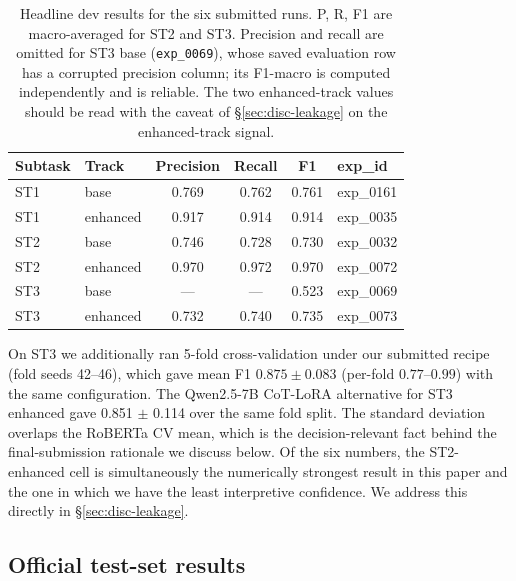 \begin{table}[h]
\centering
\small
\caption{Headline dev results for the six submitted runs. P, R, F1 are macro-averaged
for ST2 and ST3. Precision and recall are omitted for ST3 base
(\texttt{exp\_0069}), whose saved evaluation row has a corrupted precision
column; its F1-macro is computed independently and is reliable. The two
enhanced-track values should be read with the caveat of
\S\ref{sec:disc-leakage} on the enhanced-track signal.}
\label{tab:headline}
\begin{tabular}{llcccl}
\toprule
Subtask & Track & Precision & Recall & F1 & exp\_id \\
\midrule
ST1 & base     & 0.769 & 0.762 & 0.761 & exp\_0161 \\ %
ST1 & enhanced & 0.917 & 0.914 & 0.914 & exp\_0035 \\ %
ST2 & base     & 0.746 & 0.728 & 0.730 & exp\_0032 \\ %
ST2 & enhanced & 0.970 & 0.972 & 0.970 & exp\_0072 \\ %
ST3 & base     & ---   & ---   & 0.523 & exp\_0069 \\ %
ST3 & enhanced & 0.732 & 0.740 & 0.735 & exp\_0073 \\ %
\bottomrule
\end{tabular}
\end{table}

On ST3 we additionally ran 5-fold cross-validation under our submitted recipe (fold seeds 42--46), which gave mean F1 $0.875 \pm 0.083$ (per-fold $0.77$--$0.99$) with the same configuration. %
The Qwen2.5-7B CoT-LoRA alternative for ST3 enhanced gave 0.851 $\pm$ 0.114 over the same fold split. The standard deviation overlaps the RoBERTa CV mean, which is the decision-relevant fact behind the final-submission rationale we discuss below. %
Of the six numbers, the ST2-enhanced cell is simultaneously the numerically strongest result in this paper and the one in which we have the least interpretive confidence. We address this directly in \S\ref{sec:disc-leakage}.

\subsection{Official test-set results}
\label{sec:test}


